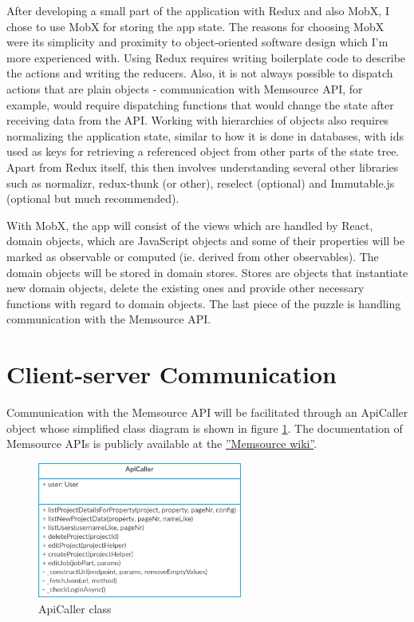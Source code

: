 


After developing a small part of the application with Redux and also MobX, I chose to use MobX for storing the app state. The reasons for choosing MobX were its simplicity and proximity to object-oriented software design which I'm more experienced with. 
Using Redux requires writing boilerplate code to describe the actions and writing the reducers. Also, it is not always possible to dispatch actions that are plain objects - communication with Memsource API, for example, would require dispatching functions that would change the state after receiving data from the API. Working with hierarchies of objects also requires normalizing the application state, similar to how it is done in databases, with ids used as keys for retrieving a referenced object from other parts of the state tree. Apart from Redux itself, this then involves understanding several other libraries such as normalizr, redux-thunk (or other), reselect (optional) and Immutable.js (optional but much recommended).


With MobX, the app will consist of the views which are handled by React, domain objects, which are JavaScript objects and some of their properties will be marked as observable or computed (ie. derived from other observables). The domain objects will be stored in domain stores. Stores are objects that instantiate new domain objects, delete the existing ones and provide other necessary functions with regard to domain objects. The last piece of the puzzle is handling communication with the Memsource API.

\section{Client-server Communication}

Communication with the Memsource API will be facilitated through an ApiCaller object whose simplified class diagram is shown in figure \ref{ApiCaller}. The documentation of Memsource APIs is publicly available at the \href{http://wiki.memsource.com/wiki/Memsource_API#API_Reference}{''Memsource wiki''}.

\begin{figure}[H]
	\includegraphics[width=0.6\textwidth]{pics/ApiCaller}
	\caption{ApiCaller class}
	\label{ApiCaller}
\end{figure}


